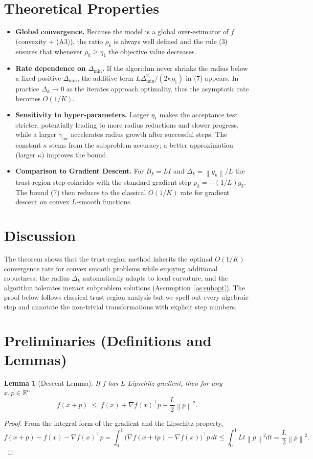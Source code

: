 \documentclass[11pt]{article}
\newtheorem{lemma}{Lemma}
\newcommand{\norm}[1]{\left\lVert #1\right\rVert}
\newcommand{\R}{\mathbb{R}}
\begin{document}
\section*{Theoretical Properties}
\begin{itemize}
\item \textbf{Global convergence.}
Because the model is a global over‑estimator of $f$ (convexity + (A3)),
the ratio $\rho_{k}$ is always well defined and the rule (3) ensures that
whenever $\rho_{k}\ge\eta_{1}$ the objective value decreases.
\item \textbf{Rate dependence on $\Delta_{\min}$.}
If the algorithm never shrinks the radius below a fixed positive
$\Delta_{\min}$, the additive term $L\Delta_{\min}^{2}/(2\kappa\eta_{1})$ in
(7) appears. In practice $\Delta_{k}\to0$ as the iterates approach
optimality, thus the asymptotic rate becomes $O(1/K)$.
\item \textbf{Sensitivity to hyper‑parameters.}
Larger $\eta_{1}$ makes the acceptance test stricter, potentially leading
to more radius reductions and slower progress, while a larger
$\gamma_{\text{inc}}$ accelerates radius growth after successful steps.
The constant $\kappa$ stems from the subproblem accuracy; a better
approximation (larger $\kappa$) improves the bound.
\item \textbf{Comparison to Gradient Descent.}
For $B_{k}=L I$ and $\Delta_{k}= \norm{g_{k}}/L$ the trust‑region step
coincides with the standard gradient step $p_{k}=-(1/L)g_{k}$.
The bound (7) then reduces to the classical $O(1/K)$ rate for
gradient descent on convex $L$‑smooth functions.
\end{itemize}

\section*{Discussion}
The theorem shows that the trust‑region method inherits the optimal
$O(1/K)$ convergence rate for convex smooth problems while enjoying
additional robustness: the radius $\Delta_{k}$ automatically adapts to
local curvature, and the algorithm tolerates inexact subproblem
solutions (Assumption~\ref{as:subopt}). The proof below follows
classical trust‑region analysis but we spell out every algebraic step
and annotate the non‑trivial transformations with explicit step numbers.

\newpage
\section*{Preliminaries (Definitions and Lemmas)}
\begin{lemma}[Descent Lemma]\label{lem:descent}
If $f$ has $L$‑Lipschitz gradient, then for any $x,p\in\R^{n}$
\[
f(x+p)\;\le\; f(x)+\nabla f(x)^{\top}p+\frac{L}{2}\norm{p}^{2}.
\tag{L1}
\]
\end{lemma}
\begin{proof}
From the integral form of the gradient and the Lipschitz property,
\[
f(x+p)-f(x)-\nabla f(x)^{\top}p
   =\int_{0}^{1}\!\bigl(\nabla f(x+tp)-\nabla f(x)\bigr)^{\!\top}p\,dt
   \le\int_{0}^{1} L t\norm{p}^{2}dt
   =\frac{L}{2}\norm{p}^{2}.
\]
\end{proof}
\end{document}
